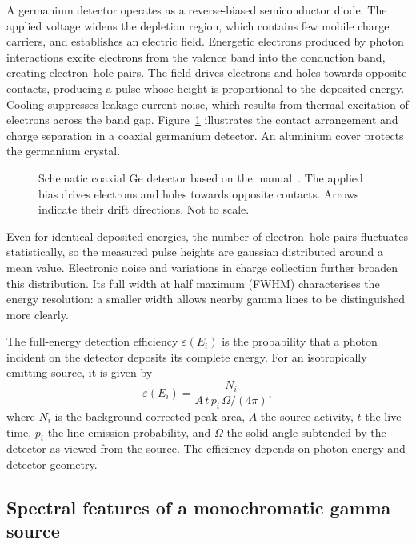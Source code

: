 A germanium detector operates as a reverse-biased semiconductor diode.
The applied voltage widens the depletion region, which contains few mobile
charge carriers, and establishes an electric field. Energetic electrons
produced by photon interactions excite electrons from the valence band into
the conduction band, creating electron--hole pairs. The field drives electrons
and holes towards opposite contacts, producing a pulse whose height is
proportional to the deposited energy. Cooling suppresses leakage-current noise,
which results from thermal excitation of electrons across the band gap.
Figure~\ref{fig:detector-schematic} illustrates
the contact arrangement and
charge separation in a coaxial germanium detector.
An aluminium cover protects the germanium crystal.

\begin{figure}[!htb]
  \centering
  
  \caption{Schematic coaxial Ge detector based on the
  manual~\cite{v18-manual}. The applied bias drives electrons and holes
  towards opposite contacts. Arrows indicate their drift directions.
  Not to scale.}
  \label{fig:detector-schematic}
\end{figure}

Even for identical deposited energies, the number of electron--hole pairs
fluctuates statistically, so the measured pulse heights are gaussian distributed around
a mean value. Electronic noise and variations in charge collection further
broaden this distribution. Its full width at
half maximum (FWHM) characterises the energy resolution: a smaller width
allows nearby gamma lines to be distinguished more clearly.

The full-energy detection efficiency $\varepsilon(E_i)$ is the probability
that a photon incident on the detector deposits its complete energy. For an
isotropically emitting source, it is given by
\begin{equation}
  \varepsilon(E_i)=\frac{N_i}{A\,t\,p_i\,\Omega/(4\pi)},
  \label{eq:full-energy-efficiency}
\end{equation}
where $N_i$ is the background-corrected peak area, $A$ the source activity,
$t$ the live time, $p_i$ the line emission probability, and $\Omega$ the solid
angle subtended by the detector as viewed from the source. The efficiency depends on
photon energy and detector geometry.

\subsection{Spectral features of a monochromatic gamma source}
\label{sec:compton-spectrum}

